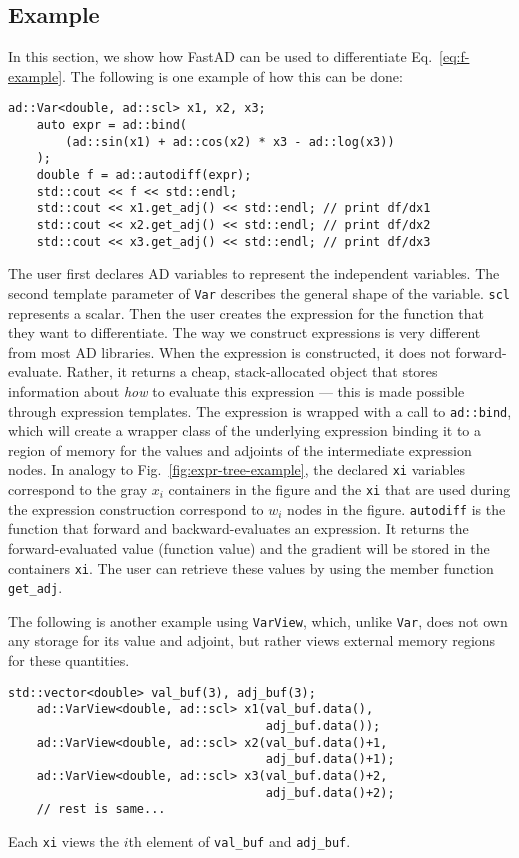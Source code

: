 \subsection{Example}\label{ssec:example}

In this section, we show how FastAD can be used to differentiate Eq.~\ref{eq:f-example}.
The following is one example of how this can be done:
\begin{lstlisting}[style=customcpp]
    ad::Var<double, ad::scl> x1, x2, x3;
    auto expr = ad::bind(
        (ad::sin(x1) + ad::cos(x2) * x3 - ad::log(x3))
    );
    double f = ad::autodiff(expr);
    std::cout << f << std::endl;
    std::cout << x1.get_adj() << std::endl; // print df/dx1
    std::cout << x2.get_adj() << std::endl; // print df/dx2
    std::cout << x3.get_adj() << std::endl; // print df/dx3
\end{lstlisting}
The user first declares AD variables to represent the independent variables.
The second template parameter of \verb|Var| describes the general shape of the variable.
\verb|scl| represents a scalar.
Then the user creates the expression for the function that they want to differentiate.
The way we construct expressions is very different from most AD libraries.
When the expression is constructed, it does not forward-evaluate.
Rather, it returns a cheap, stack-allocated object that stores information
about \emph{how} to evaluate this expression --- this is made possible through expression templates.
The expression is wrapped with a call to \verb|ad::bind|,
which will create a wrapper class of the underlying expression binding it
to a region of memory for the values and adjoints of the intermediate expression nodes.
In analogy to Fig.~\ref{fig:expr-tree-example}, the declared \verb|xi| variables
correspond to the gray $x_i$ containers in the figure and the \verb|xi|
that are used during the expression construction correspond to $w_i$ nodes in the figure.
\verb|autodiff| is the function that forward and backward-evaluates an expression.
It returns the forward-evaluated value (function value)
and the gradient will be stored in the containers \verb|xi|.
The user can retrieve these values by using the member function \verb|get_adj|.

The following is another example using \verb|VarView|,
which, unlike \verb|Var|, does not own any storage for its value and adjoint,
but rather views external memory regions for these quantities.
\begin{lstlisting}[style=customcpp]
    std::vector<double> val_buf(3), adj_buf(3);
    ad::VarView<double, ad::scl> x1(val_buf.data(), 
                                    adj_buf.data());
    ad::VarView<double, ad::scl> x2(val_buf.data()+1, 
                                    adj_buf.data()+1);
    ad::VarView<double, ad::scl> x3(val_buf.data()+2, 
                                    adj_buf.data()+2);
    // rest is same...
\end{lstlisting}
Each \verb|xi| views the $i$th element of \verb|val_buf| and \verb|adj_buf|.

